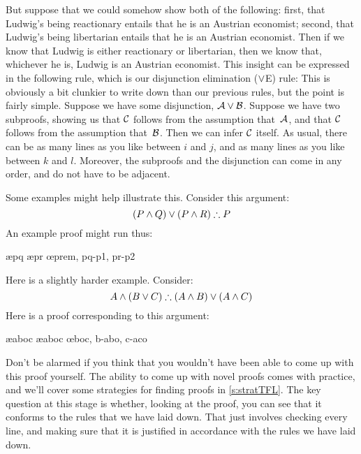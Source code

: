 But suppose that we could somehow show both of the following: first, that Ludwig's being reactionary entails that he is an Austrian economist; second, that Ludwig's being libertarian entails that he is an Austrian economist. Then if we know that Ludwig is either reactionary or libertarian, then we know that, whichever he is, Ludwig is an Austrian economist. This insight can be expressed in the following rule, which is our disjunction elimination ($\vee$E) rule:
This is obviously a bit clunkier to write down than our previous rules, but the point is fairly simple. Suppose we have some disjunction, $\mathcal{A} \vee \mathcal{B}$. Suppose we have two subproofs, showing us that $\mathcal{C}$ follows from the assumption that~$\mathcal{A}$, and that $\mathcal{C}$ follows from the assumption that~$\mathcal{B}$. Then we can infer $\mathcal{C}$ itself. As usual, there can be as many lines as you like between $i$ and $j$, and as many lines as you like between $k$ and $l$. Moreover, the subproofs and the disjunction can come in any order, and do not have to be adjacent.

Some examples might help illustrate this. Consider this argument:
$$(P \eand Q) \eor (P \eand R) \therefore P$$
An example proof might run thus:
	\begin{fitchproof}
		\PR
			\open
				\AS
				\ae{pq}
			\close
			\open
				\AS
				\ae{pr}
			\close
		\oe{prem, pq-p1, pr-p2}
	\end{fitchproof}
Here is a slightly harder example. Consider:
	$$ A \eand (B \eor C) \therefore (A \eand B) \eor (A \eand C)$$
Here is a proof corresponding to this argument:
	\begin{fitchproof}
		\hypo{aboc}{A \eand (B \eor C)}\PR
		\ae{aboc}
		\ae{aboc}
		\open
			\hypo{b}{B}\AS
			\ai{a,b}
			\have{abo}{(A \eand B) \eor (A \eand C)}\oi{ab}
		\close
		\open
			\hypo{c}{C}\AS
			\ai{a,c}
			\have{aco}{(A \eand B) \eor (A \eand C)}\oi{ac}
		\close
	\oe{boc, b-abo, c-aco}
	\end{fitchproof}
Don't be alarmed if you think that you wouldn't have been able to come up with this proof yourself. The ability to come up with novel proofs comes with practice, and we'll cover some strategies for finding proofs in \cref{s:stratTFL}. The key question at this stage is whether, looking at the proof, you can see that it conforms to the rules that we have laid down. That just involves checking every line, and making sure that it is justified in accordance with the rules we have laid down.


